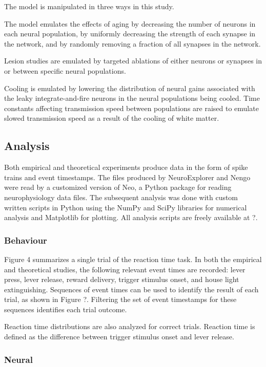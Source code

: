\documentclass[12pt]{article}
\begin{document}
The model is manipulated in three ways
in this study.

The model emulates the effects of aging
by decreasing the number of neurons
in each neural population,
by uniformly decreasing the strength
of each synapse in the network,
and by randomly removing a fraction
of all synapses in the network.

Lesion studies are emulated
by targeted ablations of either
neurons or synapses in or between specific
neural populations.

Cooling is emulated by
lowering the distribution
of neural gains associated with the
leaky integrate-and-fire neurons
in the neural populations being cooled.
Time constants affecting transmission speed
between populations are raised
to emulate slowed transmission speed
as a result of the cooling of white matter.

\subsection{Analysis}

Both empirical and theoretical experiments
produce data in the form of spike trains
and event timestamps.
The files produced by NeuroExplorer and Nengo
were read by a customized version of Neo,
a Python package for reading neurophysiology data files.
The subsequent analysis was done
with custom written scripts in Python
using the NumPy and SciPy libraries for numerical analysis
and Matplotlib for plotting.
All analysis scripts are freely available
at ?. %

\subsubsection{Behaviour}

Figure 4 summarizes a single trial
of the reaction time task.
In both the empirical and theoretical studies,
the following relevant event times are recorded:
lever press, lever release, reward delivery,
trigger stimulus onset, and house light extinguishing.
Sequences of event times can be used to
identify the result of each trial,
as shown in Figure ?.
Filtering the set of event timestamps
for these sequences identifies each trial outcome.

Reaction time distributions are also analyzed
for correct trials.
Reaction time is defined as the difference between
trigger stimulus onset and lever release.

\subsubsection{Neural}
\end{document}
